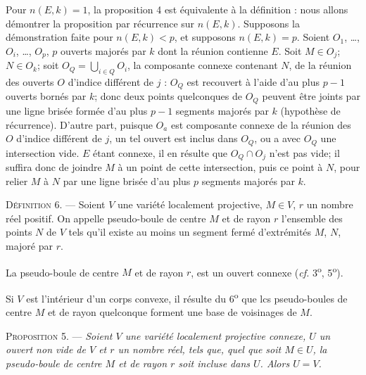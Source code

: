 \documentclass[11pt]{article}
\newcommand{\bzcf}[2]{#1}
\newenvironment{defin}[1][]{\par\medskip\noindent\textsc{Définition #1.} --- }{\par\medskip}
\newenvironment{prop}[1][]{\par\medskip\noindent\textsc{Proposition #1.} --- \itshape}{\par\medskip}
\newenvironment{proof}[1][]{\par}{\par}
\begin{document}
\begin{proof}
Pour $n(E, k)=1$, la proposition 4 est équivalente à la définition : nous allons démontrer la
proposition par récurrence sur $n(E, k)$. Supposons la démonstration faite pour $n(E, k)<p$, et
supposons $n(E, k)=p$. Soient $O_1$, \ldots, $O_i$, \ldots, $O_p$, $p$ ouverts majorés par $k$
dont la réunion contienne $E$. Soit $M\in O_j$; $N\in O_k$; soit $O_Q=\bigcup_{i\in Q} O_i$, la
composante connexe contenant $N$, de la réunion des ouverts $O$ d'indice différent de $j$ : $O_Q$
est recouvert à
l'aide d'au plus $p-1$ ouverts bornés par $k$; donc deux points quelconques de $O_Q$ peuvent être
joints par une ligne brisée formée d'au plus $p-1$ segments majorés par $k$ (hypothèse de
récurrence). D'autre part, puisque $O_a$ est composante connexe de la réunion des $O$ d'indice
différent de $j$, un tel ouvert est inclus dans $O_Q$, ou a avec $O_Q$ une intersection vide. $E$
étant connexe, il en résulte que $O_Q\cap O_j$ n'est pas vide; il suffira donc de joindre $M$ à un
point de cette intersection, puis ce point à $N$, pour relier $M$ à $N$ par une ligne brisée d'au
plus $p$ segments majorés par $k$.
\end{proof}

\begin{defin}[6]
Soient $V$ une variété localement projective, $M\in V$, $r$ un nombre réel positif. On appelle
pseudo-boule de centre $M$ et de rayon $r$ l'ensemble des points $N$ de $V$ tels qu'il existe au
moins un segment fermé d'extrémités $M$, $N$, majoré par $r$.
\end{defin}

La pseudo-boule de centre $M$ et de rayon $r$, est un ouvert connexe (\bzcf{\textit{cf.}
3\textsuperscript{o}, 5\textsuperscript{o}}{\ref{bzthm:c2s2_proprietes_pseudo_longueur}}).

Si $V$ est l'intérieur d'un corps convexe, il résulte \bzcf{du
6\textsuperscript{o}}{\ref{bzthm:c2s2_proprietes_pseudo_longueur}} que lcs pseudo-boules de centre
$M$ et de rayon quelconque forment une base de voisinages de $M$.

\begin{prop}[5]
Soient $V$ une variété localement projective connexe, $U$ un ouvert non vide de $V$ et $r$ un
nombre réel, tels que, quel que soit $M\in U$, la pseudo-boule de centre $M$ et de rayon $r$ soit
incluse dans $U$. Alors $U=V$.
\end{prop}
\end{document}
